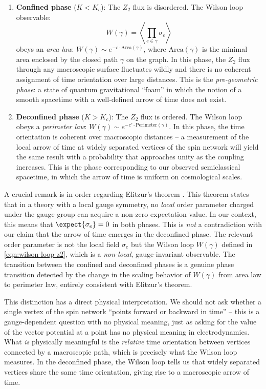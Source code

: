 \begin{enumerate}
	\item \textbf{Confined phase} ($ K < K_c $): The $ Z_2 $ flux is disordered. The Wilson loop observable:
	\begin{equation}\label{eqn:wilson-loop-z2}
		W(\gamma) = \left\langle \prod_{e \in \gamma} \sigma_e \right\rangle
	\end{equation}
	obeys an \emph{area law}: $ W(\gamma) \sim e^{-c \cdot \text{Area}(\gamma)} $, where $ \text{Area}(\gamma) $ is the minimal area enclosed by the closed path $ \gamma $ on the graph. In this phase, the $ Z_2 $ flux through any macroscopic surface fluctuates wildly and there is no coherent assignment of time orientation over large distances. This is the \emph{pre-geometric phase}: a state of quantum gravitational ``foam'' in which the notion of a smooth spacetime with a well-defined arrow of time does not exist.

	\item \textbf{Deconfined phase} ($ K > K_c $): The $ Z_2 $ flux is ordered. The Wilson loop obeys a \emph{perimeter law}: $ W(\gamma) \sim e^{-c' \cdot \text{Perimeter}(\gamma)} $. In this phase, the time orientation is coherent over macroscopic distances -- a measurement of the local arrow of time at widely separated vertices of the spin network will yield the same result with a probability that approaches unity as the coupling increases. This is the phase corresponding to our observed semiclassical spacetime, in which the arrow of time is uniform on cosmological scales.
\end{enumerate}

A crucial remark is in order regarding Elitzur's theorem \cite{Elitzur1975Impossibility}. This theorem states that in a theory with a local gauge symmetry, no \emph{local} order parameter charged under the gauge group can acquire a non-zero expectation value. In our context, this means that $ \expect{\sigma_e} = 0 $ in both phases. This is \emph{not} a contradiction with our claim that the arrow of time emerges in the deconfined phase. The relevant order parameter is not the local field $ \sigma_e $ but the Wilson loop $ W(\gamma) $ defined in \eqref{eqn:wilson-loop-z2}, which is a \emph{non-local}, gauge-invariant observable. The transition between the confined and deconfined phases is a genuine phase transition detected by the change in the scaling behavior of $ W(\gamma) $ from area law to perimeter law, entirely consistent with Elitzur's theorem.

This distinction has a direct physical interpretation. We should not ask whether a single vertex of the spin network ``points forward or backward in time'' -- this is a gauge-dependent question with no physical meaning, just as asking for the value of the vector potential at a point has no physical meaning in electrodynamics. What \emph{is} physically meaningful is the \emph{relative} time orientation between vertices connected by a macroscopic path, which is precisely what the Wilson loop measures. In the deconfined phase, the Wilson loop tells us that widely separated vertices share the same time orientation, giving rise to a macroscopic arrow of time.

